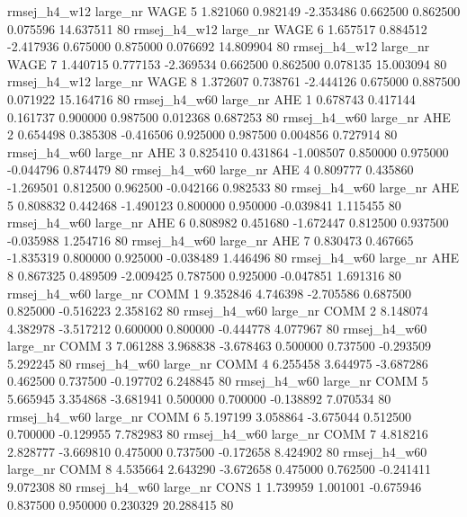 rmsej_h4_w12   large_nr     WAGE                 5  1.821060  0.982149  -2.353486 0.662500 0.862500  0.075596   14.637511 80
rmsej_h4_w12   large_nr     WAGE                 6  1.657517  0.884512  -2.417936 0.675000 0.875000  0.076692   14.809904 80
rmsej_h4_w12   large_nr     WAGE                 7  1.440715  0.777153  -2.369534 0.662500 0.862500  0.078135   15.003094 80
rmsej_h4_w12   large_nr     WAGE                 8  1.372607  0.738761  -2.444126 0.675000 0.887500  0.071922   15.164716 80
rmsej_h4_w60   large_nr      AHE                 1  0.678743  0.417144   0.161737 0.900000 0.987500  0.012368    0.687253 80
rmsej_h4_w60   large_nr      AHE                 2  0.654498  0.385308  -0.416506 0.925000 0.987500  0.004856    0.727914 80
rmsej_h4_w60   large_nr      AHE                 3  0.825410  0.431864  -1.008507 0.850000 0.975000 -0.044796    0.874479 80
rmsej_h4_w60   large_nr      AHE                 4  0.809777  0.435860  -1.269501 0.812500 0.962500 -0.042166    0.982533 80
rmsej_h4_w60   large_nr      AHE                 5  0.808832  0.442468  -1.490123 0.800000 0.950000 -0.039841    1.115455 80
rmsej_h4_w60   large_nr      AHE                 6  0.808982  0.451680  -1.672447 0.812500 0.937500 -0.035988    1.254716 80
rmsej_h4_w60   large_nr      AHE                 7  0.830473  0.467665  -1.835319 0.800000 0.925000 -0.038489    1.446496 80
rmsej_h4_w60   large_nr      AHE                 8  0.867325  0.489509  -2.009425 0.787500 0.925000 -0.047851    1.691316 80
rmsej_h4_w60   large_nr     COMM                 1  9.352846  4.746398  -2.705586 0.687500 0.825000 -0.516223    2.358162 80
rmsej_h4_w60   large_nr     COMM                 2  8.148074  4.382978  -3.517212 0.600000 0.800000 -0.444778    4.077967 80
rmsej_h4_w60   large_nr     COMM                 3  7.061288  3.968838  -3.678463 0.500000 0.737500 -0.293509    5.292245 80
rmsej_h4_w60   large_nr     COMM                 4  6.255458  3.644975  -3.687286 0.462500 0.737500 -0.197702    6.248845 80
rmsej_h4_w60   large_nr     COMM                 5  5.665945  3.354868  -3.681941 0.500000 0.700000 -0.138892    7.070534 80
rmsej_h4_w60   large_nr     COMM                 6  5.197199  3.058864  -3.675044 0.512500 0.700000 -0.129955    7.782983 80
rmsej_h4_w60   large_nr     COMM                 7  4.818216  2.828777  -3.669810 0.475000 0.737500 -0.172658    8.424902 80
rmsej_h4_w60   large_nr     COMM                 8  4.535664  2.643290  -3.672658 0.475000 0.762500 -0.241411    9.072308 80
rmsej_h4_w60   large_nr     CONS                 1  1.739959  1.001001  -0.675946 0.837500 0.950000  0.230329   20.288415 80

